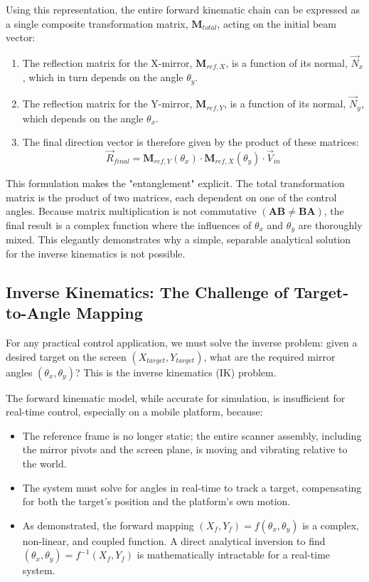 \documentclass[12pt]{article}
\begin{document}
Using this representation, the entire forward kinematic chain can be expressed as a single composite transformation matrix, \(\mathbf{M}_{total}\), acting on the initial beam vector:

\begin{enumerate}
\item The reflection matrix for the X-mirror, \(\mathbf{M}_{ref,X}\), is a function of its normal, \(\vec{N}_x\), which in turn depends on the angle \(\theta_y\).
\item The reflection matrix for the Y-mirror, \(\mathbf{M}_{ref,Y}\), is a function of its normal, \(\vec{N}_y\), which depends on the angle \(\theta_x\).
\item The final direction vector is therefore given by the product of these matrices:
\begin{equation}
\vec{R}_{final} = \mathbf{M}_{ref,Y}(\theta_x) \cdot \mathbf{M}_{ref,X}(\theta_y) \cdot \vec{V}_{in}
\end{equation}
\end{enumerate}

This formulation makes the "entanglement" explicit. The total transformation matrix is the product of two matrices, each dependent on one of the control angles. Because matrix multiplication is not commutative \((\mathbf{A}\mathbf{B} \neq \mathbf{B}\mathbf{A})\), the final result is a complex function where the influences of \(\theta_x\) and \(\theta_y\) are thoroughly mixed. This elegantly demonstrates why a simple, separable analytical solution for the inverse kinematics is not possible.

\subsection{Inverse Kinematics: The Challenge of Target-to-Angle Mapping}

For any practical control application, we must solve the inverse problem: given a desired target on the screen \((X_{target}, Y_{target})\), what are the required mirror angles \((\theta_x, \theta_y)\)? This is the inverse kinematics (IK) problem.

The forward kinematic model, while accurate for simulation, is insufficient for real-time control, especially on a mobile platform, because:
\begin{itemize}
\item The reference frame is no longer static; the entire scanner assembly, including the mirror pivots and the screen plane, is moving and vibrating relative to the world.
\item The system must solve for angles in real-time to track a target, compensating for both the target's position and the platform's own motion.
\item As demonstrated, the forward mapping \((X_f, Y_f) = f(\theta_x, \theta_y)\) is a complex, non-linear, and coupled function. A direct analytical inversion to find \((\theta_x, \theta_y) = f^{-1}(X_f, Y_f)\) is mathematically intractable for a real-time system.
\end{itemize}
\end{document}
